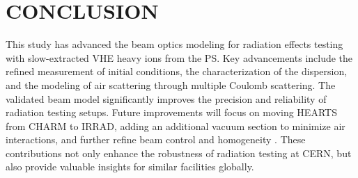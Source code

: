 \documentclass[a4paper,
               biblatex,     %
               ]{jacow}
\begin{document}






\section{CONCLUSION}

This study has advanced the beam optics modeling for radiation effects testing with slow-extracted VHE heavy ions from the PS. Key advancements include the refined measurement of initial conditions, the characterization of the dispersion, and the modeling of air scattering through multiple Coulomb scattering. The validated beam model significantly improves the precision and reliability of radiation testing setups. Future improvements will focus on moving HEARTS from CHARM to IRRAD, adding an additional vacuum section to minimize air interactions, and further refine beam control and homogeneity \cite{scarpa:ipac24-thpr27}. These contributions not only enhance the robustness of radiation testing at CERN, but also provide valuable insights for similar facilities globally.


%
{\printbibliography}
\end{document}
